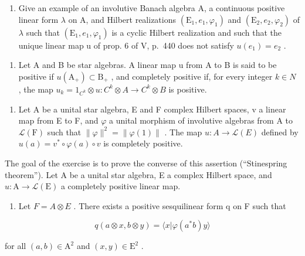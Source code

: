 \begin{enumerate}
\def\labelenumi{\alph{enumi})}
\setcounter{enumi}{1}
\tightlist
\item
  Give an example of an involutive Banach algebra A, a continuous positive linear form \(\lambda\) on A, and Hilbert realizations \((\mathrm{E}_{1}, e_{1}, \varphi_{1})\) and \((\mathrm{E}_{2}, e_{2}, \varphi_{2})\) of \(\lambda\) such that \((\mathrm{E}_{1}, e_{1}, \varphi_{1})\) is a cyclic Hilbert realization and such that the unique linear map u of prop. 6 of V, p.~440 does not satisfy \(u(e_{1}) = e_{2}\) .
\end{enumerate}

\begin{enumerate}
\def\labelenumi{\arabic{enumi})}
\setcounter{enumi}{3}
\tightlist
\item
  Let A and B be star algebras. A linear map u from A to B is said to be positive if \(u(\mathrm{A}_{+}) \subset \mathrm{B}_{+}\) , and completely positive if, for every integer \(k \in N\) , the map \(u_{k} = 1_{C^{k}} \otimes u: C^{k} \otimes A \to C^{k} \otimes B\) is positive.
\end{enumerate}

\begin{enumerate}
\def\labelenumi{\alph{enumi})}
\tightlist
\item
  Let A be a unital star algebra, E and F complex Hilbert spaces, v a linear map from E to F, and \(\varphi\) a unital morphism of involutive algebras from A to \(\mathcal{L}(\mathrm{F})\) such that \(\|\varphi\|^{2} = \|\varphi(1)\|\) . The map \(u: A \to \mathcal{L}(E)\) defined by \(u(a) = v^{*} \circ \varphi(a) \circ v\) is completely positive.
\end{enumerate}

The goal of the exercise is to prove the converse of this assertion (“Stinespring theorem”). Let A be a unital star algebra, E a complex Hilbert space, and \(u \colon \mathrm{A} \to \mathcal{L}(\mathrm{E})\) a completely positive linear map.

\begin{enumerate}
\def\labelenumi{\alph{enumi})}
\setcounter{enumi}{1}
\tightlist
\item
  Let \(F = A \otimes E\) . There exists a positive sesquilinear form q on F such that
\end{enumerate}

\[
q (a \otimes x, b \otimes y) = \langle x | \varphi (a ^ {*} b) y \rangle
\]

for all \((a,b)\in \mathrm{A}^2\) and \((x,y)\in \mathrm{E}^2\) .

